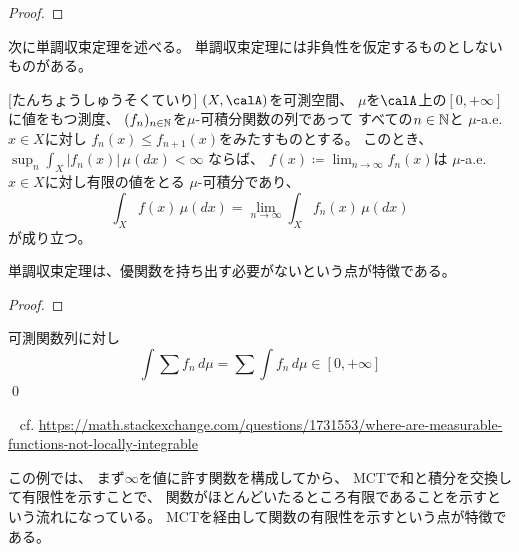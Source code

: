 \documentclass[report]{jlreq}
\begin{document}
\begin{proof}
    \TODO{}
\end{proof}

次に単調収束定理を述べる。
単調収束定理には非負性を仮定するものとしないものがある。

\begin{theorem}
    \TODO{}
\end{theorem}

\begin{theorem}
    [たんちょうしゅうそくていり]
    $(X, \calA)$を可測空間、
    $\mu$を$\calA$上の$[0, +\infty]$に値をもつ測度、
    $(f_n)_{n \in \mathbb{N}}$を$\mu$-可積分関数の列であって
    すべての$n \in \mathbb{N}$と
    $\mu$-a.e. $x \in X$に対し
    $f_n(x) \le f_{n + 1}(x)$をみたすものとする。
    このとき、
    $\sup_n \int_X |f_n(x)| \, \mu(dx) < \infty$
    ならば、
    $f(x) \coloneqq \lim_{n \to \infty} f_n(x)$は
    $\mu$-a.e. $x \in X$に対し有限の値をとる
    $\mu$-可積分であり、
    \begin{equation}
        \int_X f(x) \, \mu(dx)
            = \lim_{n \to \infty} \int_X f_n(x) \, \mu(dx)
    \end{equation}
    が成り立つ。
\end{theorem}

単調収束定理は、優関数を持ち出す必要がないという点が特徴である。

\begin{proof}
    \TODO{}
\end{proof}

\begin{corollary}[和と積分の交換]
    可測関数列に対し
    \begin{equation}
        \int \sum f_n \, d\mu = \sum \int f_n \, d\mu
            \in [0, +\infty]
    \end{equation}
    \qed
\end{corollary}

\begin{example}[局所可積分でない可測関数]
    ~
    cf. \url{https://math.stackexchange.com/questions/1731553/where-are-measurable-functions-not-locally-integrable}

    この例では、
    まず$\infty$を値に許す関数を構成してから、
    MCTで和と積分を交換して有限性を示すことで、
    関数がほとんどいたるところ有限であることを示すという流れになっている。
    MCTを経由して関数の有限性を示すという点が特徴である。
\end{example}
\end{document}
